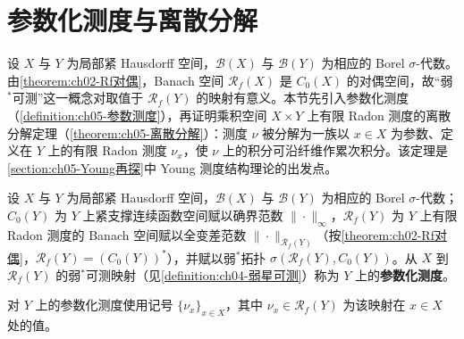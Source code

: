 \documentclass[../../main.tex]{subfiles}%
\begin{document}
\section{参数化测度与离散分解}\label{section:ch05-参数化测度}

设 $X$ 与 $Y$ 为局部紧 Hausdorff 空间，$\mathscr{B}(X)$ 与 $\mathscr{B}(Y)$ 为相应的 Borel $\sigma$-代数。由\cref{theorem:ch02-Rf对偶}，Banach 空间 $\mathscr{R}_f(X)$ 是 $C_0(X)$ 的对偶空间，故“弱$^*$可测”这一概念对取值于 $\mathscr{R}_f(Y)$ 的映射有意义。本节先引入参数化测度（\cref{definition:ch05-参数测度}），再证明乘积空间 $X\times Y$ 上有限 Radon 测度的离散分解定理（\cref{theorem:ch05-离散分解}）：测度 $\nu$ 被分解为一族以 $x\in X$ 为参数、定义在 $Y$ 上的有限 Radon 测度 $\nu_x$，使 $\nu$ 上的积分可沿纤维作累次积分。该定理是\cref{section:ch05-Young再探}中 Young 测度结构理论的出发点。

\begin{definition}[参数化测度]\label{definition:ch05-参数测度}
设 $X$ 与 $Y$ 为局部紧 Hausdorff 空间，$\mathscr{B}(X)$ 与 $\mathscr{B}(Y)$ 为相应的 Borel $\sigma$-代数；$C_0(Y)$ 为 $Y$ 上紧支撑连续函数空间赋以确界范数 $\|\cdot\|_\infty$，$\mathscr{R}_f(Y)$ 为 $Y$ 上有限 Radon 测度的 Banach 空间赋以全变差范数 $\|\cdot\|_{\mathscr{R}_f(Y)}$（按\cref{theorem:ch02-Rf对偶}，$\mathscr{R}_f(Y)=(C_0(Y))^*$），并赋以弱$^*$拓扑 $\sigma(\mathscr{R}_f(Y),C_0(Y))$。从 $X$ 到 $\mathscr{R}_f(Y)$ 的弱$^*$可测映射（见\cref{definition:ch04-弱星可测}）称为 $Y$ 上的\textbf{参数化测度}。

对 $Y$ 上的参数化测度使用记号 $\{\nu_x\}_{x\in X}$，其中 $\nu_x\in\mathscr{R}_f(Y)$ 为该映射在 $x\in X$ 处的值。
\end{definition}
\end{document}
